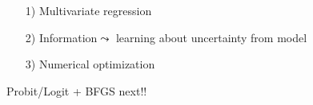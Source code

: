 \documentclass{beamer}
\begin{document}
\begin{frame}

\begin{itemize}
\item[1)] Multivariate regression
\item[2)] \alert{Information}$\leadsto$ learning about uncertainty from model
\item[3)] Numerical optimization
\end{itemize}

Probit/Logit + BFGS next!!



\end{frame}
\end{document}
